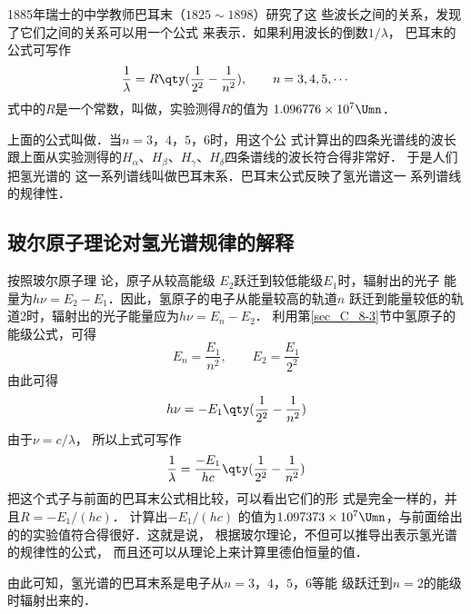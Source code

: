 1885年瑞士的中学教师巴耳末（$1825 \sim 1898$）研究了这
些波长之间的关系，发现了它们之间的关系可以用一个公式
来表示．如果利用波长的倒数$1/\lambda$，
巴耳末的公式可写作
\[\frac{1}{\lambda}=R\qty(\frac{1}{2^2}-\frac{1}{n^2}),\qquad n=3,4,5,\cdots\]
式中的$R$是一个常数，叫做，实验测得$R$的值为
$1.096776\times10^7\Umn$．

上面的公式叫做．当$n=3 $，$ 4 $，$ 5 $，$ 6$时，用这个公
式计算出的四条光谱线的波长跟上面从实验测得的$H_{\alpha}$、$H_{\beta}$、$H_{\gamma}$、$H_{\delta}$四条谱线的波长符合得非常好．
于是人们把氢光谱的
这一系列谱线叫做巴耳末系．巴耳末公式反映了氢光谱这一
系列谱线的规律性．

\subsection{玻尔原子理论对氢光谱规律的解释} 

按照玻尔原子理
论，原子从较高能级 $E_2$跃迁到较低能级$E_1$时，辐射出的光子
能量为$h\nu =E_2-E_1$．因此，氢原子的电子从能量较高的轨道$n$
跃迁到能量较低的轨道2时，辐射出的光子能量应为$h\nu=E_n-E_2$．
利用第\ref{sec_C_8-3}节中氢原子的能级公式，可得
\[E_n=\frac{E_1}{n^2},\qquad E_2=\frac{E_1}{2^2} \]
由此可得\[h\nu=-E_1\qty( \frac{1}{2^2}-\frac{1}{n^2} )\]
由于$\nu=c/\lambda$，
所以上式可写作
\[\frac{1}{\lambda}=\frac{-E_1}{hc}\qty( \frac{1}{2^2}-\frac{1}{n^2})\]
把这个式子与前面的巴耳末公式相比较，可以看出它们的形
式是完全一样的，并且$R=-E_1/(hc)$．
计算出$-E_1/(hc)$
的值为$1.097373\times10^7 \Umn $，与前面给出的的实验值符合得很好．这就是说，
根据玻尔理论，不但可以推导出表示氢光谱的规律性的公式，
而且还可以从理论上来计算里德伯恒量的值．

由此可知，氢光谱的巴耳末系是电子从$n=3 $，$ 4 $，$ 5 $，$ 6$等能
级跃迁到$n=2$的能级时辐射出来的．

